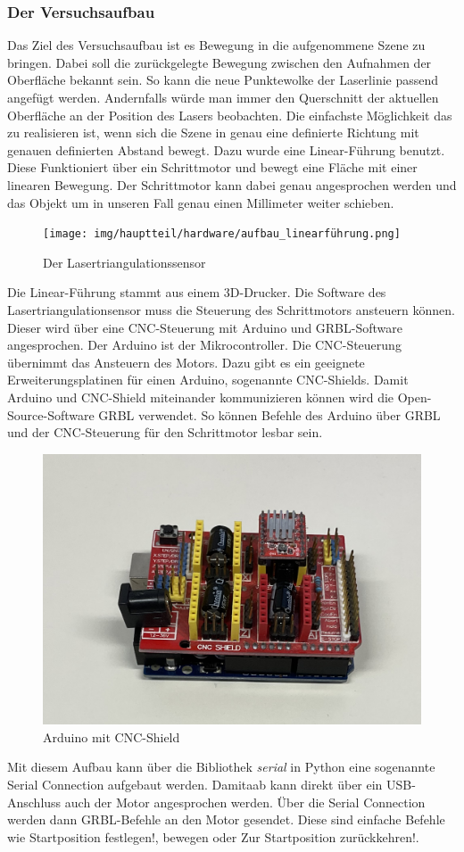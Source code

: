 		\subsubsection{Der Versuchsaufbau}
		Das Ziel des Versuchsaufbau ist es Bewegung in die aufgenommene Szene zu bringen. Dabei soll die zurückgelegte Bewegung zwischen den Aufnahmen der Oberfläche bekannt sein. So kann die neue Punktewolke der Laserlinie passend angefügt werden. Andernfalls würde man immer den Querschnitt der aktuellen Oberfläche an der Position des Lasers beobachten. Die einfachste Möglichkeit das zu realisieren ist, wenn sich die Szene in genau eine definierte Richtung mit genauen definierten Abstand bewegt. Dazu wurde eine Linear-Führung benutzt. Diese Funktioniert über ein Schrittmotor und bewegt eine Fläche mit einer linearen Bewegung. Der Schrittmotor kann dabei genau angesprochen werden und das Objekt um in unseren Fall genau einen Millimeter weiter schieben.
		\begin{figure}[h]
			\centering
			\texttt{[image: img/hauptteil/hardware/aufbau\_linearführung.png]}
			\caption{Der Lasertriangulationssensor}
			\label{fig:aufbau_scanner}
		\end{figure}
		Die Linear-Führung stammt aus einem 3D-Drucker. Die Software des Lasertriangulationsensor muss die Steuerung des Schrittmotors ansteuern können. Dieser wird über eine CNC-Steuerung mit Arduino und GRBL-Software angesprochen. Der Arduino ist der Mikrocontroller. Die CNC-Steuerung übernimmt das Ansteuern des Motors. Dazu gibt es ein geeignete Erweiterungsplatinen für einen Arduino, sogenannte CNC-Shields. Damit Arduino und CNC-Shield miteinander kommunizieren können wird die Open-Source-Software GRBL verwendet. So können Befehle des Arduino über GRBL und der CNC-Steuerung für den Schrittmotor lesbar sein.
		\begin{figure}[h]
			\centering
			\includegraphics[width=0.45\linewidth]{img/hauptteil/hardware/arduino.png}
			\caption{Arduino mit CNC-Shield}
			\label{fig:arduino}
		\end{figure}
		Mit diesem Aufbau kann über die Bibliothek \textit{serial} in Python eine sogenannte \glqq Serial Connection\grqq{} aufgebaut werden. Damitaab kann direkt über ein USB-Anschluss auch der Motor angesprochen werden. Über die Serial Connection werden dann GRBL-Befehle an den Motor gesendet. Diese sind einfache Befehle wie \glqq Startposition festlegen!\grqq{}, \glqq 1mm bewegen\grqq{} oder \glqq Zur Startposition zurückkehren!\grqq{}.
		
